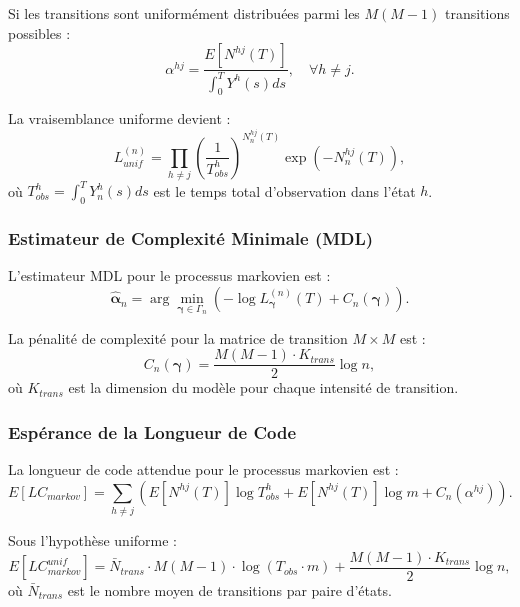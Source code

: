 \documentclass[11pt,a4paper]{article}
\begin{document}
	Si les transitions sont uniformément distribuées parmi les $M(M-1)$ transitions possibles :
	\begin{equation}
		\alpha^{hj} = \frac{E[N^{hj}(T)]}{\int_0^T Y^h(s) ds}, \quad \forall h \neq j.
	\end{equation}
	
	La vraisemblance uniforme devient :
	\begin{equation}
		L_{unif}^{(n)} = \prod_{h \neq j} \left( \frac{1}{T_{obs}^h} \right)^{N_n^{hj}(T)} \exp\left( - N_n^{hj}(T) \right),
	\end{equation}
	où $T_{obs}^h = \int_0^T Y_n^h(s) ds$ est le temps total d'observation dans l'état $h$.
	
	\subsubsection{Estimateur de Complexité Minimale (MDL)}
	
	L'estimateur MDL pour le processus markovien est :
	\begin{equation}
		\hat{\boldsymbol{\alpha}}_n = \arg \min_{\boldsymbol{\gamma} \in \Gamma_n} \left( -\log L_{\boldsymbol{\gamma}}^{(n)}(T) + C_n(\boldsymbol{\gamma}) \right).
	\end{equation}
	
	La pénalité de complexité pour la matrice de transition $M \times M$ est :
	\begin{equation}
		C_n(\boldsymbol{\gamma}) = \frac{M(M-1) \cdot K_{trans}}{2} \log n,
	\end{equation}
	où $K_{trans}$ est la dimension du modèle pour chaque intensité de transition.
	
	\subsubsection{Espérance de la Longueur de Code}
	
	La longueur de code attendue pour le processus markovien est :
	\begin{equation}
		E[LC_{markov}] = \sum_{h \neq j} \left( E[N^{hj}(T)] \log T_{obs}^h + E[N^{hj}(T)] \log m + C_n(\alpha^{hj}) \right).
	\end{equation}
	
	Sous l'hypothèse uniforme :
	\begin{equation}
		E[LC_{markov}^{unif}] = \bar{N}_{trans} \cdot M(M-1) \cdot \log(T_{obs} \cdot m) + \frac{M(M-1) \cdot K_{trans}}{2} \log n,
	\end{equation}
	où $\bar{N}_{trans}$ est le nombre moyen de transitions par paire d'états.
	
\end{document}
